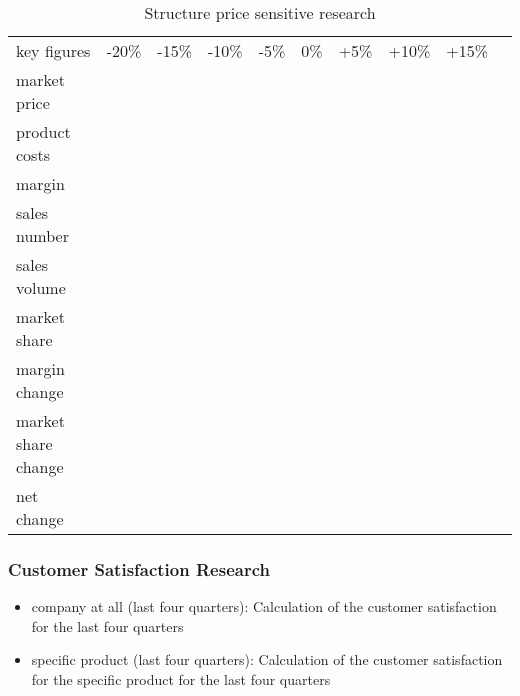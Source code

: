 \documentclass[11pt,titlepage,oneside,openany]{book}
\begin{document}
       \begin{table}[ht]
        \centering
        \begin{tabular}{|l|r|r|r|r|r|r|r|r|r|}
        \hline
        key figures             & -20\% & -15\% & -10\% & -5\%  & 0\%   & +5\%  & +10\% & +15\%   \\
        market price            &       &       &       &       &       &       &       &         \\
        product costs           &       &       &       &       &       &       &       &         \\
        margin                  &       &       &       &       &       &       &       &         \\
        sales number            &       &       &       &       &       &       &       &         \\
        sales volume            &       &       &       &       &       &       &       &         \\
        market share            &       &       &       &       &       &       &       &         \\
        margin change           &       &       &       &       &       &       &       &         \\
        market share change     &       &       &       &       &       &       &       &         \\
        net change              &       &       &       &       &       &       &       &         \\
        \hline
        \end{tabular}
        \caption{Structure price sensitive research}
        \label{MR_price_sensitive}
        \end{table}

\subsubsection{Customer Satisfaction Research}
    \begin{itemize}
        \item company at all (last four quarters): Calculation of the customer satisfaction for the last four quarters 
        \item specific product (last four quarters): Calculation of the customer satisfaction for the specific product for the last four quarters 
    \end{itemize}
    
\end{document}
